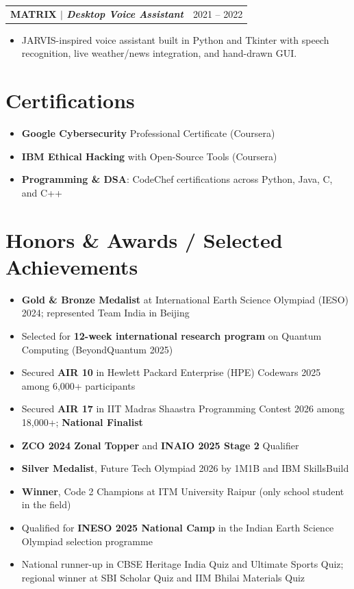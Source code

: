 \documentclass[10pt,a4paper]{article}
\makeatletter
\newcommand{\resumeItem}[1]{
  \item\small{#1}
}
\newcommand{\resumeProjectHeading}[2]{
  \vspace{3pt}
  \begin{tabular*}{\textwidth}[t]{l@{\extracolsep{\fill}}r}
    \textbf{#1} & {\small #2} \\
  \end{tabular*}\vspace{0pt}
}
\makeatother
\begin{document}
  \resumeProjectHeading
    {\textbf{MATRIX} $\vert$ \emph{Desktop Voice Assistant}}{2021 -- 2022}
    \begin{itemize}
      \resumeItem{JARVIS-inspired voice assistant built in Python and Tkinter with speech recognition, live weather/news integration, and hand-drawn GUI.}
    \end{itemize}

\section{Certifications}
  \begin{itemize}
    \resumeItem{\textbf{Google Cybersecurity} Professional Certificate (Coursera)}
    \resumeItem{\textbf{IBM Ethical Hacking} with Open-Source Tools (Coursera)}
    \resumeItem{\textbf{Programming \& DSA}: CodeChef certifications across Python, Java, C, and C++}
  \end{itemize}

\section{Honors \& Awards / Selected Achievements}
  \begin{itemize}
    \resumeItem{\textbf{Gold \& Bronze Medalist} at International Earth Science Olympiad (IESO) 2024; represented Team India in Beijing}
    \resumeItem{Selected for \textbf{12-week international research program} on Quantum Computing (BeyondQuantum 2025)}
    \resumeItem{Secured \textbf{AIR 10} in Hewlett Packard Enterprise (HPE) Codewars 2025 among 6,000+ participants}
    \resumeItem{Secured \textbf{AIR 17} in IIT Madras Shaastra Programming Contest 2026 among 18,000+; \textbf{National Finalist}}
    \resumeItem{\textbf{ZCO 2024 Zonal Topper} and \textbf{INAIO 2025 Stage 2} Qualifier}
    \resumeItem{\textbf{Silver Medalist}, Future Tech Olympiad 2026 by 1M1B and IBM SkillsBuild}
    \resumeItem{\textbf{Winner}, Code 2 Champions at ITM University Raipur (only school student in the field)}
    \resumeItem{Qualified for \textbf{INESO 2025 National Camp} in the Indian Earth Science Olympiad selection programme}
    \resumeItem{National runner-up in CBSE Heritage India Quiz and Ultimate Sports Quiz; regional winner at SBI Scholar Quiz and IIM Bhilai Materials Quiz}
  \end{itemize}
\end{document}
